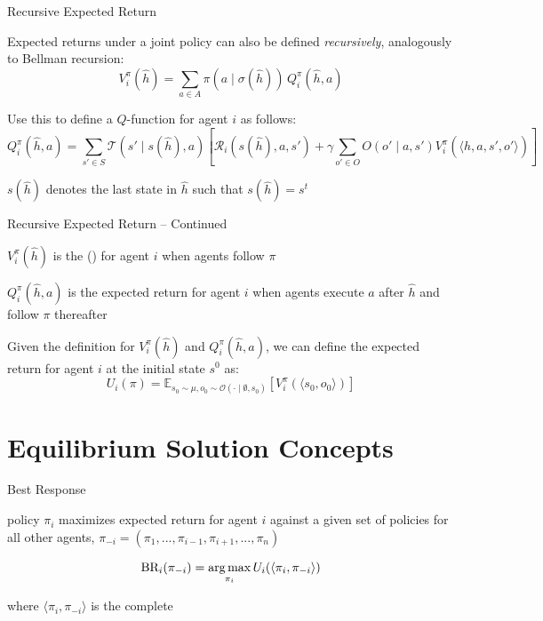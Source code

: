 \begin{frame}{Recursive Expected Return}

    Expected returns under a joint policy can also be defined {\it recursively}, analogously to Bellman recursion:
    \[
        V^{\pi}_i(\hat{h}) = \sum_{a \in A} \pi(a \mid \sigma(\hat{h})) \, Q^{\pi}_i (\hat{h}, a)
    \]

	\vspace{5pt}

    Use this to define a $Q$-function for agent \(i\) as follows:
    \[
        Q^{\pi}_i(\hat{h}, a) = \sum_{s' \in S} \mathcal{T}(s' \mid s(\hat{h}), a) \left[ \mathcal{R}_i(s(\hat{h}), a, s') + \gamma \sum_{o' \in O} O(o' \mid a, s') V^{\pi}_i(\langle \hat{h}, a, s', o'\rangle) \right]
    \]

    \blist
        \item \(s(\hat{h})\) denotes the last state in \(\hat{h}\) such that \(s(\hat{h}) = s^t\)
    \elist
    
\end{frame}

\begin{frame}{Recursive Expected Return -- Continued}

    \blist
    	\itemsep=10pt
        \item \(V^{\pi}_i(\hat{h})\) is the  () for agent \(i\) when agents follow  \(\pi\)
        \item \(Q^{\pi}_i(\hat{h}, a)\) is the expected return for agent \(i\) when agents execute  \(a\) after \(\hat{h}\) and follow \(\pi\) thereafter
        \item Given the definition for \(V^{\pi}_i(\hat{h})\) and  \(Q^{\pi}_i(\hat{h}, a)\), we can define the expected return for agent \(i\) at the initial state \(s^0\) as:
    \elist
    \vspace{2pt}
    \[
    U_i(\pi) = \mathbb{E}_{s_0 \sim \mu, o_0 \sim \mathcal{O}(\cdot \mid \emptyset,  s_0)} \left[ V^{\pi}_i(\langle s_0, o_0 \rangle) \right]
    \]
    
\end{frame}


\section{Equilibrium Solution Concepts}

\begin{frame}{Best Response}

\begin{bluebox}
	 policy $\pi_i$ maximizes expected return for agent \(i\) against a given set of policies for all other agents, \(\pi_{-i} = (\pi_1, ..., \pi_{i-1}, \pi_{i+1}, ..., \pi_{n})\)
    
    $$\text{BR}_i(\pi_{-i}) = \operatorname*{arg\,max}_{\pi_{i}} U_i(\langle\pi_i, \pi_{-i}\rangle)$$
        
    where $\langle\pi_i, \pi_{-i}\rangle$ is the complete 
\end{bluebox}

\end{frame}


